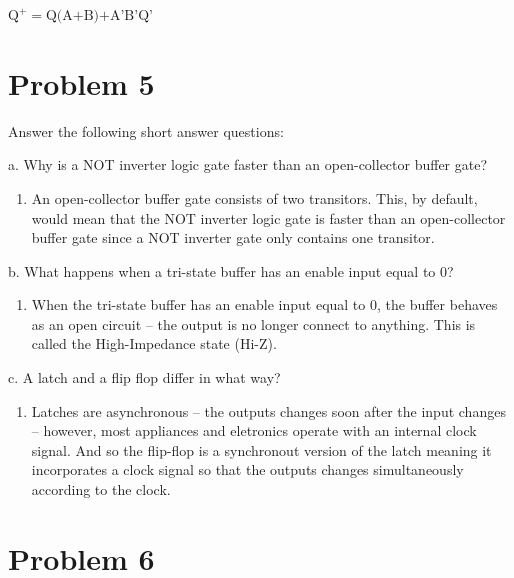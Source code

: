 \documentclass{article}
\begin{document}
    $\boxed{\text{Q}^+ = \text{Q(A+B)+A'B'Q'}}$



    \section*{Problem 5}

    Answer the following short answer questions:

    a. Why is a NOT inverter logic gate faster than an open-collector buffer gate?

    \begin{enumerate}[label={\bfseries Solution:}, leftmargin=*]
        \item An open-collector buffer gate consists of two transitors. This, by default,
        would mean that the NOT inverter logic gate is faster than an open-collector
        buffer gate since a NOT inverter gate only contains one transitor.
    \end{enumerate}

    b. What happens when a tri-state buffer has an enable input equal to 0?

    \begin{enumerate}[label={\bfseries Solution:}, leftmargin=*]
        \item When the tri-state buffer has an enable input equal to 0, the buffer behaves as an open
        circuit -- the output is no longer connect to anything. This is called the High-Impedance
        state (Hi-Z).
    \end{enumerate}

    c. A latch and a flip flop differ in what way?

    \begin{enumerate}[label={\bfseries Solution:}, leftmargin=*]
        \item Latches are asynchronous -- the outputs changes soon after the input changes --
        however, most appliances and eletronics operate with an internal clock signal. And 
        so the flip-flop is a synchronout version of the latch meaning it incorporates a
        clock signal so that the outputs changes simultaneously according to the clock.
    \end{enumerate}


    \section*{Problem 6}
\end{document}
